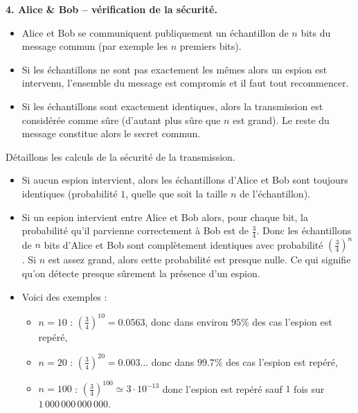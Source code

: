 \documentclass[11pt,class=report,crop=false]{standalone}
\begin{document}
\textbf{4. Alice \& Bob -- vérification de la sécurité.}

\begin{itemize}
  \item Alice et Bob se communiquent publiquement un échantillon de $n$ bits du message commun (par exemple les $n$ premiers bits).
  \item Si les échantillons ne sont pas exactement les mêmes alors un espion est intervenu, l'ensemble du message est compromis et il faut tout recommencer.
  \item Si les échantillons sont exactement identiques, alors la transmission est considérée comme sûre (d'autant plus sûre que $n$ est grand). Le reste du message constitue alors le secret commun.
\end{itemize}



Détaillons les calculs de la sécurité de la transmission. 
\begin{itemize}
  \item Si aucun espion intervient, alors les échantillons d'Alice et Bob sont toujours identiques (probabilité $1$, quelle que soit la taille $n$ de l'échantillon).
  \item Si un espion intervient entre Alice et Bob alors, pour chaque bit, la probabilité qu'il parvienne correctement à Bob est de $\frac34$. Donc les échantillons de $n$ bits d'Alice et Bob sont complètement identiques avec probabilité $\left(\frac34\right)^n$.
  Si $n$ est assez grand, alors cette probabilité est presque nulle. Ce qui signifie qu'on détecte presque sûrement la présence d'un espion.

  \item Voici des exemples :
  \begin{itemize}
    \item $n=10$ : $\left(\frac34\right)^{10} = 0.0563$, donc dans environ $95\%$ des cas l'espion est repéré,

    \item $n=20$ : $\left(\frac34\right)^{20} = 0.003\ldots$ donc dans $99.7\%$ des cas l'espion est repéré,
    \item $n=100$ : $\left(\frac34\right)^{100} \simeq 3 \cdot 10^{-13}$ donc l'espion est repéré sauf $1$ fois sur $1\,000\,000\,000\,000$.
  \end{itemize}
\end{itemize}

\medskip
\end{document}

